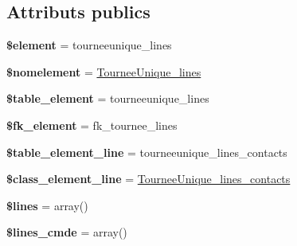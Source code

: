 \subsection*{Attributs publics}
\begin{DoxyCompactItemize}
\item 
\mbox{\label{classTourneeUnique__lines_a248fe415c5a0d8064fa51944e163177d}} 
{\bfseries \$element} = \textquotesingle{}tourneeunique\+\_\+lines\textquotesingle{}
\item 
\mbox{\label{classTourneeUnique__lines_a76b77ae4a27c7fc9ba989bcdecdaba2e}} 
{\bfseries \$nomelement} = \textquotesingle{}\hyperlink{classTourneeUnique__lines}{Tournee\+Unique\+\_\+lines}\textquotesingle{}
\item 
\mbox{\label{classTourneeUnique__lines_ac334ea9f31702eb0cdb4c1df47b8e146}} 
{\bfseries \$table\+\_\+element} = \textquotesingle{}tourneeunique\+\_\+lines\textquotesingle{}
\item 
\mbox{\label{classTourneeUnique__lines_aa3c2cbe5fe3b9d07b64eaee7335210cf}} 
{\bfseries \$fk\+\_\+element} = \textquotesingle{}fk\+\_\+tournee\+\_\+lines\textquotesingle{}
\item 
\mbox{\label{classTourneeUnique__lines_aaf68fde374a0b061e6e4a3e2c384eaaa}} 
{\bfseries \$table\+\_\+element\+\_\+line} = \textquotesingle{}tourneeunique\+\_\+lines\+\_\+contacts\textquotesingle{}
\item 
\mbox{\label{classTourneeUnique__lines_a8139a57bf1fedc0657afeb1fd87b1457}} 
{\bfseries \$class\+\_\+element\+\_\+line} = \textquotesingle{}\hyperlink{classTourneeUnique__lines__contacts}{Tournee\+Unique\+\_\+lines\+\_\+contacts}\textquotesingle{}
\item 
\mbox{\label{classTourneeUnique__lines_a41cecc9b1479fb7b96484c2d1c997524}} 
{\bfseries \$lines} = array()
\item 
\mbox{\label{classTourneeUnique__lines_a26c7b66c6682d8c61caa2b6da9d17309}} 
{\bfseries \$lines\+\_\+cmde} = array()
\item 

\end{DoxyCompactItemize}
